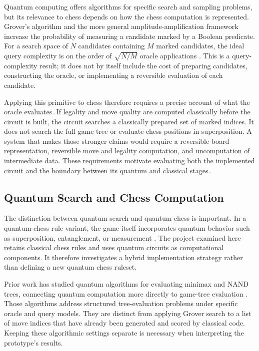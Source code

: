 \documentclass[conference]{IEEEtran}
\begin{document}
Quantum computing offers algorithms for specific search and sampling problems, but its relevance to chess depends on how the chess computation is represented. Grover's algorithm and the more general amplitude-amplification framework increase the probability of measuring a candidate marked by a Boolean predicate. For a search space of $N$ candidates containing $M$ marked candidates, the ideal query complexity is on the order of $\sqrt{N/M}$ oracle applications \cite{grover1996,boyer1998,brassard2002}. This is a query-complexity result; it does not by itself include the cost of preparing candidates, constructing the oracle, or implementing a reversible evaluation of each candidate.

Applying this primitive to chess therefore requires a precise account of what the oracle evaluates. If legality and move quality are computed classically before the circuit is built, the circuit searches a classically prepared set of marked indices. It does not search the full game tree or evaluate chess positions in superposition. A system that makes those stronger claims would require a reversible board representation, reversible move and legality computation, and uncomputation of intermediate data. These requirements motivate evaluating both the implemented circuit and the boundary between its quantum and classical stages.

\subsection{Quantum Search and Chess Computation}
The distinction between quantum search and quantum chess is important. In a quantum-chess rule variant, the game itself incorporates quantum behavior such as superposition, entanglement, or measurement \cite{cantwell2019}. The project examined here retains classical chess rules and uses quantum circuits as computational components. It therefore investigates a hybrid implementation strategy rather than defining a new quantum chess ruleset.

Prior work has studied quantum algorithms for evaluating minimax and NAND trees, connecting quantum computation more directly to game-tree evaluation \cite{cleve2008,farhi2008}. Those algorithms address structured tree-evaluation problems under specific oracle and query models. They are distinct from applying Grover search to a list of move indices that have already been generated and scored by classical code. Keeping these algorithmic settings separate is necessary when interpreting the prototype's results.
\end{document}
